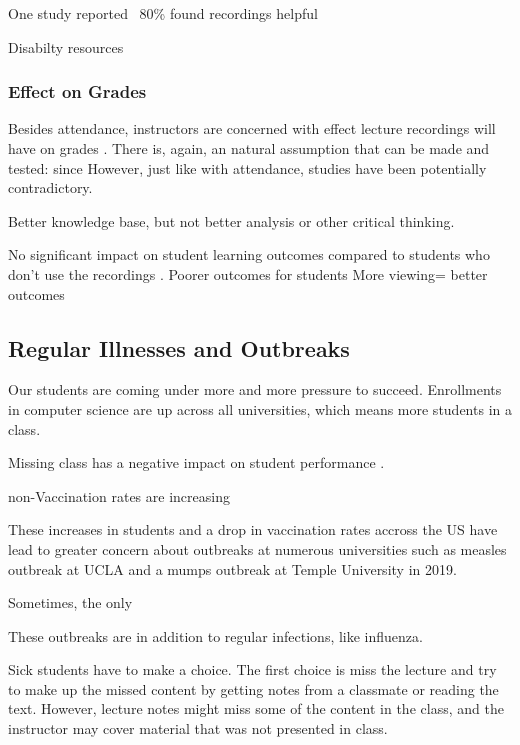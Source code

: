 \documentclass[sigconf]{acmart}
\begin{document}
One study reported ~80\% found recordings helpful \cite{maynor2013student}


Disabilty resources

\subsubsection{Effect on Grades}
Besides attendance, instructors are concerned with effect lecture recordings will have on grades \cite{maynor2013student}.
There is, again, an natural assumption that can be made and tested: since
However, just like with attendance, studies have been potentially contradictory.

Better knowledge base, but not better analysis or other critical thinking.\cite{bos2016use}



No significant impact on student learning outcomes compared to students who don't use the recordings \cite{leadbeater2013evaluating}.
Poorer outcomes for students \cite{johnston2013digital}
More viewing= better outcomes 
\cite{traphagan2010impact}
\subsection{Regular Illnesses and Outbreaks}
Our students are coming under more and more pressure to succeed.  
Enrollments in computer science are up across all universities, which means more students in a class. 

Missing class has a negative impact on student performance \cite{traphagan2010impact}.


non-Vaccination rates are increasing\cite{omer2009vaccine}

These increases in students and a drop in vaccination rates accross the US have lead to greater concern about outbreaks at numerous universities such as measles outbreak at UCLA \cite{uclameas} and a mumps outbreak at Temple University \cite{emezienna2019resurgence} in 2019.

Sometimes, the only 

These outbreaks are in addition to regular infections, like influenza. 


Sick students have to make a choice. 
The first choice is miss the lecture and try to make up the missed content by getting notes from a classmate or reading the text.
However, lecture notes might miss some of the content in the class, and the instructor may cover material that was not presented in class.
\end{document}
